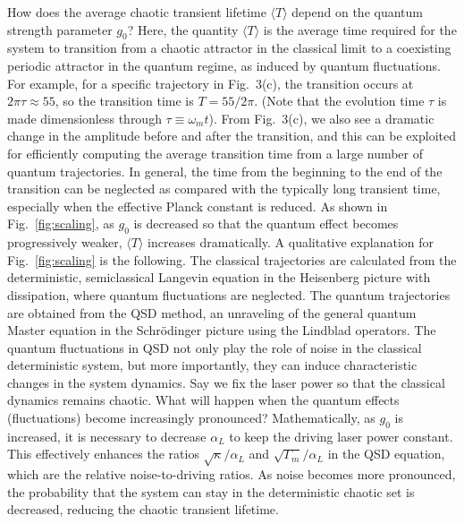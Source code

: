 \documentclass[12pt]{wlscirep}
\begin{document}
How does the average chaotic transient lifetime $\langle T\rangle$ depend on the
quantum strength parameter $g_0$? 
Here, the quantity $\langle T\rangle$ is the average time required for the
system to transition from a chaotic attractor in the classical limit
to a coexisting periodic attractor in the quantum regime, as induced
by quantum fluctuations. For example, for a specific trajectory in
Fig.~3(c), the transition occurs at $2\pi\tau\approx55$, so the
transition time is $T=55/2\pi$. (Note that the evolution time
$\tau$ is made dimensionless through $\tau\equiv\omega_mt$). From
Fig.~3(c), we also see a dramatic change in the amplitude before and
after the transition, and this can be exploited for efficiently computing the  
average transition time from a large number of quantum trajectories.
In general, the time from the beginning to the end of the transition can be
neglected as compared with the typically long transient time,
especially when the effective Planck constant is reduced.
As shown in Fig.~\ref{fig:scaling}, as $g_0$ is decreased so that 
the quantum effect becomes progressively weaker, $\langle T\rangle$ 
increases dramatically. A qualitative
explanation for Fig.~\ref{fig:scaling} is the following. The classical
trajectories are calculated from the deterministic, semiclassical Langevin
equation in the Heisenberg picture with dissipation, where quantum fluctuations
are neglected. The quantum trajectories are obtained from the QSD method, an
unraveling of the general quantum Master equation in the Schr\"{o}dinger picture
using the Lindblad operators.  The quantum fluctuations in QSD not only play the
role of noise in the classical deterministic system, but more importantly, they
can induce characteristic changes in the system dynamics. Say we fix the laser
power so that the classical dynamics remains chaotic. What will happen when the
quantum effects (fluctuations) become increasingly pronounced? Mathematically,
as $g_0$ is increased, it is necessary to decrease $\alpha_L$ to keep the
driving laser power constant. This effectively enhances the ratios
$\sqrt{\kappa}/\alpha_L$ and $\sqrt{\Gamma_m}/\alpha_L$ in the QSD equation,
which are the relative noise-to-driving ratios. As noise becomes more
pronounced, the probability that the system can stay in the deterministic
chaotic set is decreased, reducing the chaotic transient lifetime.
\end{document}
